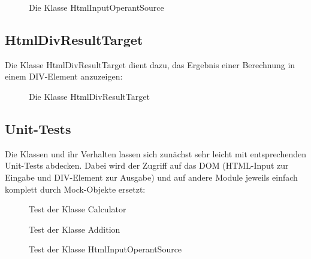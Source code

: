 \begin{figure}[H]
	\begin{center}
		\caption{Die Klasse HtmlInputOperantSource}
		\label{code:inputoperant}
	\end{center}
\end{figure}

\subsection{HtmlDivResultTarget}

Die Klasse HtmlDivResultTarget dient dazu, das Ergebnis einer Berechnung in einem DIV-Element anzuzeigen:

\begin{figure}[H]
	\begin{center}
		\caption{Die Klasse HtmlDivResultTarget}
		\label{code:resulttarget}
	\end{center}
\end{figure}

\subsection{Unit-Tests}

Die Klassen und ihr Verhalten lassen sich zunächst sehr leicht mit entsprechenden Unit-Tests abdecken. Dabei wird der Zugriff auf das DOM (HTML-Input zur Eingabe und DIV-Element zur Ausgabe) und auf andere Module jeweils einfach komplett durch Mock-Objekte ersetzt:

\begin{figure}[H]
	\begin{center}
		\caption{Test der Klasse Calculator}
		\label{code:calculatortest}
	\end{center}
\end{figure}

\begin{figure}[H]
	\begin{center}
		\caption{Test der Klasse Addition}
		\label{code:additiontest}
	\end{center}
\end{figure}

\begin{figure}[H]
	\begin{center}
		\caption{Test der Klasse HtmlInputOperantSource}
		\label{code:inputsourcetest}
	\end{center}
\end{figure}

